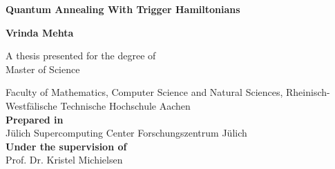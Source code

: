 \begin{titlepage}
    \begin{center}
        \vspace*{1cm}
 
        \Large
        \textbf{Quantum Annealing With Trigger Hamiltonians}
 
        \vspace{0.5cm}
 
        \vspace{1.5cm}
 
        \textbf{Vrinda Mehta}
 
        \vfill
 
        A thesis presented for the degree of\\
        Master of Science
 
        \vspace{0.8cm}
 
        Faculty of Mathematics, Computer Science and Natural Sciences, Rheinisch-Westfälische Technische Hochschule Aachen\\
        \textbf{Prepared in}\\
        J{\"u}lich Supercomputing Center
        Forschungszentrum J{\"u}lich\\
        \textbf{Under the supervision of}\\
        Prof. Dr. Kristel Michielsen
 
    \end{center}
\end{titlepage}